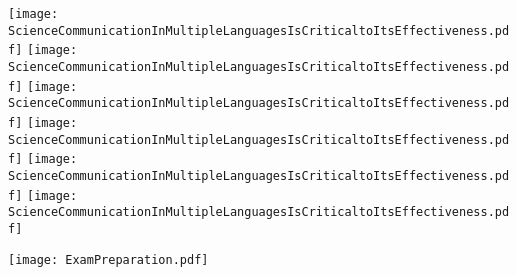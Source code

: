\documentclass[main.tex]{subfiles}
\begin{document}
\setcounter{subsection}{18}
\label{task:2024-04-24-2}
{\parindent10pt\texttt{[image: ScienceCommunicationInMultipleLanguagesIsCriticaltoItsEffectiveness.pdf]}}\newpage
{\parindent10pt\texttt{[image: ScienceCommunicationInMultipleLanguagesIsCriticaltoItsEffectiveness.pdf]}}\newpage
{\parindent10pt\texttt{[image: ScienceCommunicationInMultipleLanguagesIsCriticaltoItsEffectiveness.pdf]}}\newpage
{\parindent10pt\texttt{[image: ScienceCommunicationInMultipleLanguagesIsCriticaltoItsEffectiveness.pdf]}}\newpage
{\parindent10pt\texttt{[image: ScienceCommunicationInMultipleLanguagesIsCriticaltoItsEffectiveness.pdf]}}\newpage
{\parindent10pt\texttt{[image: ScienceCommunicationInMultipleLanguagesIsCriticaltoItsEffectiveness.pdf]}}

\setcounter{subsection}{19}
\label{task:2024-05-14}
{\parindent25pt\texttt{[image: ExamPreparation.pdf]}}\newpage
\end{document}
